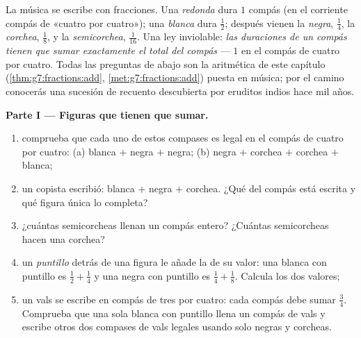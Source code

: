 \begin{problem}
\label{pb:g7:fractions:1}
La música se escribe con fracciones. Una \emph{redonda} dura $1$
compás (en el corriente compás de «cuatro por cuatro»); una \emph{blanca}
dura $\frac12$; después vienen la \emph{negra}, $\frac14$, la
\emph{corchea}, $\frac18$, y la \emph{semicorchea},
$\frac{1}{16}$. Una ley inviolable: \emph{las duraciones de un
compás tienen que sumar exactamente el total del compás} --- $1$ en el
compás de cuatro por cuatro. Todas las preguntas de abajo son la aritmética de este capítulo
(\cref{thm:g7:fractions:add}, \cref{met:g7:fractions:add}) puesta en
música; por el camino conocerás una sucesión de recuento descubierta por
eruditos indios hace mil años.

\medskip
\noindent\textbf{Parte I --- Figuras que tienen que sumar.}
\begin{enumerate}
  \item comprueba que cada uno de estos compases es legal en el compás de cuatro
        por cuatro: (a) blanca $+$ negra $+$ negra; (b) negra $+$
        corchea $+$ corchea $+$ blanca;
  \item un copista escribió: blanca $+$ negra $+$ corchea. ¿Qué
         del compás está escrita y qué figura única
        lo completa?
  \item ¿cuántas semicorcheas llenan un compás entero? ¿Cuántas
        semicorcheas hacen una corchea?
  \item un \emph{puntillo} detrás de una figura le añade la  de su valor: una
        blanca con puntillo es $\frac12 + \frac14$ y una negra con puntillo es
        $\frac14 + \frac18$. Calcula los dos valores;
  \item un vals se escribe en compás de tres por cuatro: cada compás debe
        sumar $\frac34$. Comprueba que una sola blanca con puntillo llena un
        compás de vals y escribe otros dos compases de vals legales
        usando solo negras y corcheas.
\end{enumerate}


\end{problem}
